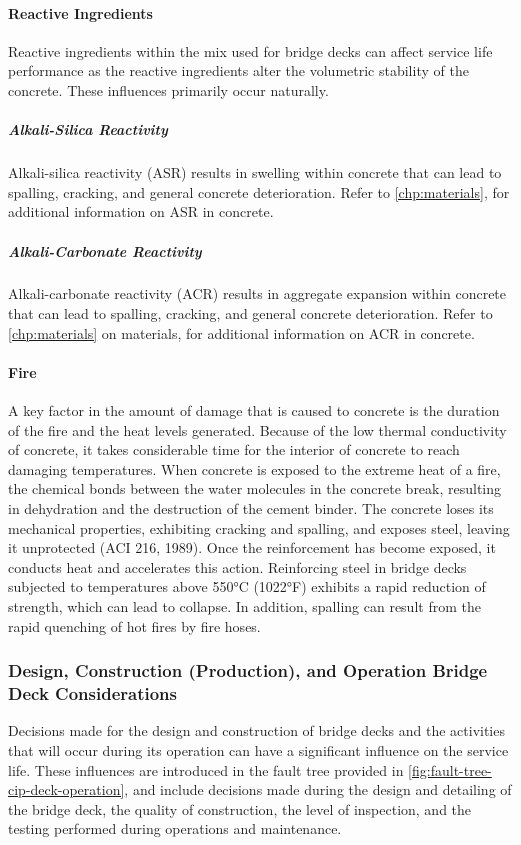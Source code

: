 \paragraph{Reactive Ingredients}
Reactive ingredients within the mix used for bridge decks can affect service life performance as the reactive ingredients alter the volumetric stability of the concrete. These influences primarily occur naturally.  \subparagraph*{Alkali-Silica Reactivity} Alkali-silica reactivity (ASR) results in swelling within concrete that can lead to spalling, cracking, and general concrete deterioration. Refer to \cref{chp:materials}, for additional information on ASR in concrete.

\subparagraph*{Alkali-Carbonate Reactivity}
Alkali-carbonate reactivity (ACR) results in aggregate expansion within concrete that can lead to spalling, cracking, and general concrete deterioration. Refer to \cref{chp:materials} on materials, for additional information on ACR in concrete.

\paragraph{Fire}
A key factor in the amount of damage that is caused to concrete is the duration of the fire and the heat levels generated. Because of the low thermal conductivity of concrete, it takes considerable time for the interior of concrete to reach damaging temperatures. When concrete is exposed to the extreme heat of a fire, the chemical bonds between the water molecules in the concrete break, resulting in dehydration and the destruction of the cement binder. The concrete loses its mechanical properties, exhibiting cracking and spalling, and exposes steel, leaving it unprotected (ACI 216, 1989). Once the reinforcement has become exposed, it conducts heat and accelerates this action.  Reinforcing steel in bridge decks subjected to temperatures above 550°C (1022°F) exhibits a rapid reduction of strength, which can lead to collapse. In addition, spalling can result from the rapid quenching of hot fires by fire hoses.

\subsubsection{Design, Construction (Production), and Operation Bridge Deck Considerations}
Decisions made for the design and construction of bridge decks and the activities that will occur during its operation can have a significant influence on the service life. These influences are introduced in the fault tree provided in \cref{fig:fault-tree-cip-deck-operation}, and include decisions made during the design and detailing of the bridge deck, the quality of construction, the level of inspection, and the testing performed during operations and maintenance.

